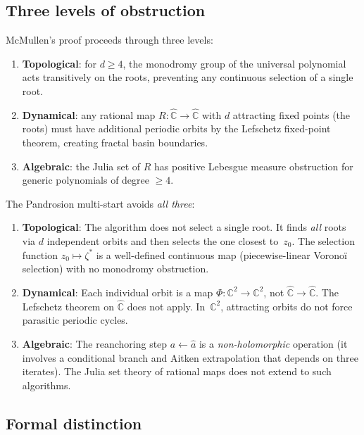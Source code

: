 \documentclass[10pt,a4paper,oneside]{book}
\theoremstyle{definition}
\theoremstyle{remark}
\begin{document}
\subsection{Three levels of obstruction}

McMullen's proof proceeds through three levels:

\begin{enumerate}
\item \textbf{Topological}: for $d \geq 4$, the monodromy group of the universal polynomial acts transitively on the roots, preventing any continuous selection of a single root.
\item \textbf{Dynamical}: any rational map $R: \hat{\mathbb{C}} \to \hat{\mathbb{C}}$ with $d$ attracting fixed points (the roots) must have additional periodic orbits by the Lefschetz fixed-point theorem, creating fractal basin boundaries.
\item \textbf{Algebraic}: the Julia set of $R$ has positive Lebesgue measure obstruction for generic polynomials of degree $\geq 4$.
\end{enumerate}

The Pandrosion multi-start avoids \emph{all three}:

\begin{enumerate}
\item \textbf{Topological}: The algorithm does not select a single root.  It finds \emph{all} roots via $d$ independent orbits and then selects the one closest to~$z_0$.  The selection function $z_0 \mapsto \zeta^*$ is a well-defined continuous map (piecewise-linear Vorono\"i selection) with no monodromy obstruction.

\item \textbf{Dynamical}: Each individual orbit is a map $\Phi: \mathbb{C}^2 \to \mathbb{C}^2$, not $\hat{\mathbb{C}} \to \hat{\mathbb{C}}$.  The Lefschetz theorem on $\hat{\mathbb{C}}$ does not apply.  In~$\mathbb{C}^2$, attracting orbits do not force parasitic periodic cycles.

\item \textbf{Algebraic}: The reanchoring step $a \leftarrow \hat{a}$ is a \emph{non-holomorphic} operation (it involves a conditional branch and Aitken extrapolation that depends on three iterates).  The Julia set theory of rational maps does not extend to such algorithms.
\end{enumerate}

\subsection{Formal distinction}
\end{document}
